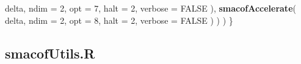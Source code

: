 \documentclass[
  12pt,
]{article}
\newenvironment{Shaded}{\begin{snugshade}}{\end{snugshade}}
\newcommand{\AttributeTok}[1]{\textcolor[rgb]{0.13,0.29,0.53}{#1}}
\newcommand{\ConstantTok}[1]{\textcolor[rgb]{0.56,0.35,0.01}{#1}}
\newcommand{\DecValTok}[1]{\textcolor[rgb]{0.00,0.00,0.81}{#1}}
\newcommand{\FunctionTok}[1]{\textcolor[rgb]{0.13,0.29,0.53}{\textbf{#1}}}
\newcommand{\NormalTok}[1]{#1}
\begin{document}
\begin{Shaded}
\begin{Highlighting}[]
\NormalTok{        delta,}
        \AttributeTok{ndim =} \DecValTok{2}\NormalTok{,}
        \AttributeTok{opt =} \DecValTok{7}\NormalTok{,}
        \AttributeTok{halt =} \DecValTok{2}\NormalTok{,}
        \AttributeTok{verbose =} \ConstantTok{FALSE}
\NormalTok{      ),}
      \FunctionTok{smacofAccelerate}\NormalTok{(}
\NormalTok{        delta,}
        \AttributeTok{ndim =} \DecValTok{2}\NormalTok{,}
        \AttributeTok{opt =} \DecValTok{8}\NormalTok{,}
        \AttributeTok{halt =} \DecValTok{2}\NormalTok{,}
        \AttributeTok{verbose =} \ConstantTok{FALSE}
\NormalTok{      )}
\NormalTok{    )}
\NormalTok{  )}
\NormalTok{\}}
\end{Highlighting}
\end{Shaded}

\subsection{smacofUtils.R}\label{smacofutils.r}
\end{document}
